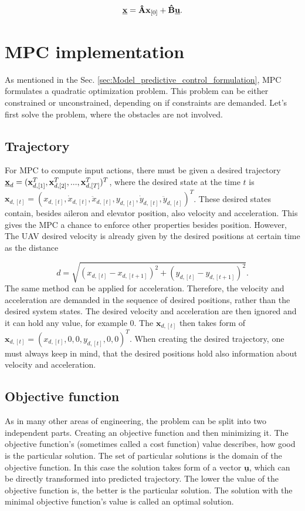 \documentclass[a4paper,11pt,titlepage]{article}
\newcommand{\uvec}{\textbf{\underline{u}}}
\begin{document}
\begin{equation}
\label{eq:prediction_final}
\textbf{\underline{x}} = \textbf{\^A}\textbf{x}_{[0]} + \textbf{\^B}\uvec.
\end{equation}

\section{MPC implementation}
As mentioned in the Sec. \ref{sec:Model_predictive_control_formulation}, MPC formulates a quadratic optimization problem. This problem can be either constrained or unconstrained, depending on if constraints are demanded. Let's first solve the problem, where the obstacles are not involved. 
\subsection{Trajectory}
For MPC to compute input actions, there must be given a desired trajectory $\textbf{\underline{x}}_d = 
(\textbf{x}_{d,[1]}^T, \textbf{x}_{d,[2]}^T, ..., \textbf{x}_{d,[T]}^T)^T$, where the desired state at the time $t$ is $\textbf{x}_{d,[t]} = (x_{d,[t]}, \dot{x}_{d,[t]}, \ddot{x}_{d,[t]}, y_{d,[t]}, \dot{y}_{d,[t]}, \ddot{y}_{d,[t]})^T$. These desired states contain, besides aileron and elevator position, also velocity and acceleration. This gives the MPC a chance to  enforce other properties besides position. However, The UAV desired velocity is already given by the desired positions at certain time as the distance 

\begin{equation}
d = \sqrt{(x_{d,[t]}-x_{d,[t+1]})^2+ (y_{d,[t]}- y_{d,[t+1]})^2}.
\end{equation} 
The same method can be applied for acceleration. Therefore, the velocity and acceleration are demanded in the sequence of desired positions, rather than the desired system states. The desired velocity and acceleration are then ignored and it can hold any value, for example 0. The $\textbf{x}_{d,[t]}$ then takes form of $\textbf{x}_{d,[t]} = (x_{d,[t]}, 0, 0, y_{d,[t]}, 0, 0)^T$. When creating the desired trajectory, one must always keep in mind, that the desired positions hold also information about velocity and acceleration.

\subsection{Objective function}
\label{sec:objective_function}
As in many other areas of engineering, the problem can be split into two independent parts. Creating an objective function and then minimizing it. The objective function's (sometimes called a cost function) value describes, how good is the particular solution. The set of particular solutions is the domain of the objective function. In this case the solution takes form of a vector $\underline{\textbf{u}}$, which can be directly transformed into predicted trajectory. The lower the value of the objective function is, the better is the particular solution. The solution with the minimal objective function's value is called an optimal solution.
\end{document}
